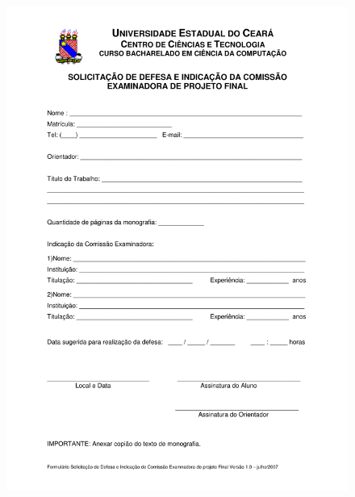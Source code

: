 \clearpage
\large{}
\label{anx:defesa}
\begin{figure}[htbp]
\centering
\includegraphics[scale=0.6]{requisitos/Formulario_Solicitacao_Defesa_e_Banca_v1.pdf}
\end{figure}

